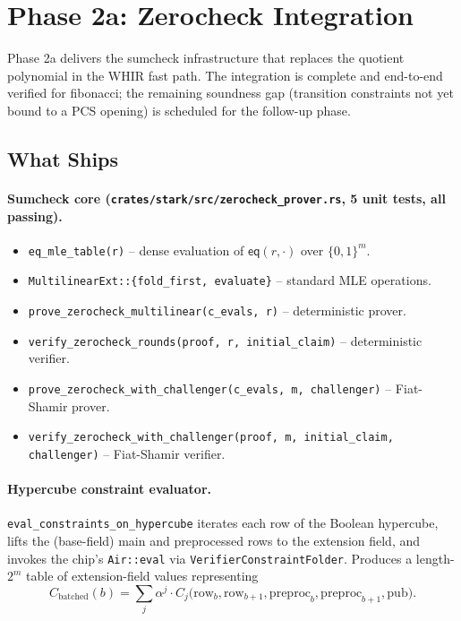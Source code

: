 \section{Phase 2a: Zerocheck Integration}
\label{sec:zerocheck-phase2a}

Phase 2a delivers the sumcheck infrastructure that replaces the quotient
polynomial in the WHIR fast path.  The integration is complete and
end-to-end verified for fibonacci; the remaining soundness gap (transition
constraints not yet bound to a PCS opening) is scheduled for the follow-up
phase.

\subsection{What Ships}

\paragraph{Sumcheck core (\texttt{crates/stark/src/zerocheck\_prover.rs}, 5 unit tests, all passing).}
\begin{itemize}
  \item \texttt{eq\_mle\_table(r)} -- dense evaluation of $\mathsf{eq}(r,\cdot)$ over $\{0,1\}^m$.
  \item \texttt{MultilinearExt::\{fold\_first, evaluate\}} -- standard MLE operations.
  \item \texttt{prove\_zerocheck\_multilinear(c\_evals, r)} -- deterministic prover.
  \item \texttt{verify\_zerocheck\_rounds(proof, r, initial\_claim)} -- deterministic verifier.
  \item \texttt{prove\_zerocheck\_with\_challenger(c\_evals, m, challenger)} -- Fiat-Shamir prover.
  \item \texttt{verify\_zerocheck\_with\_challenger(proof, m, initial\_claim, challenger)} -- Fiat-Shamir verifier.
\end{itemize}

\paragraph{Hypercube constraint evaluator.}
\texttt{eval\_constraints\_on\_hypercube} iterates each row of the Boolean
hypercube, lifts the (base-field) main and preprocessed rows to the
extension field, and invokes the chip's \texttt{Air::eval} via
\texttt{VerifierConstraintFolder}.  Produces a length-$2^m$ table of
extension-field values representing
$$C_{\mathrm{batched}}(b) = \sum_j \alpha^j \cdot C_j\bigl(\mathrm{row}_b, \mathrm{row}_{b+1}, \mathrm{preproc}_b, \mathrm{preproc}_{b+1}, \mathrm{pub}\bigr).$$

